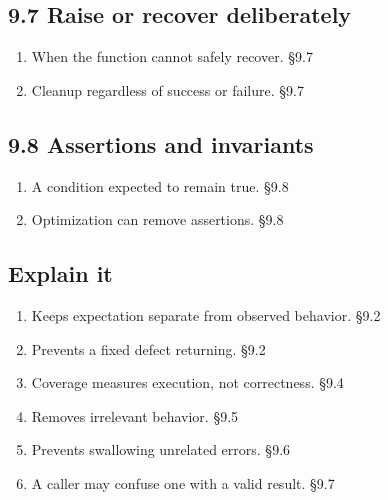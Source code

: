 \documentclass[11pt]{article}
\begin{document}
\begin{keepsection}\subsection{9.7 Raise or recover deliberately}

\begin{enumerate}
\item When the function cannot safely recover. \hfill{\small\color{FAUblue}§9.7}
\item Cleanup regardless of success or failure. \hfill{\small\color{FAUblue}§9.7}
\end{enumerate}

\end{keepsection}
\begin{keepsection}\subsection{9.8 Assertions and invariants}

\begin{enumerate}
\item A condition expected to remain true. \hfill{\small\color{FAUblue}§9.8}
\item Optimization can remove assertions. \hfill{\small\color{FAUblue}§9.8}
\end{enumerate}

\end{keepsection}
\begin{keepsection}\subsection{Explain it}

\begin{enumerate}
\item Keeps expectation separate from observed behavior. \hfill{\small\color{FAUblue}§9.2}
\item Prevents a fixed defect returning. \hfill{\small\color{FAUblue}§9.2}
\item Coverage measures execution, not correctness. \hfill{\small\color{FAUblue}§9.4}
\item Removes irrelevant behavior. \hfill{\small\color{FAUblue}§9.5}
\item Prevents swallowing unrelated errors. \hfill{\small\color{FAUblue}§9.6}
\item A caller may confuse one with a valid result. \hfill{\small\color{FAUblue}§9.7}
\end{enumerate}

\end{keepsection}
\end{document}
